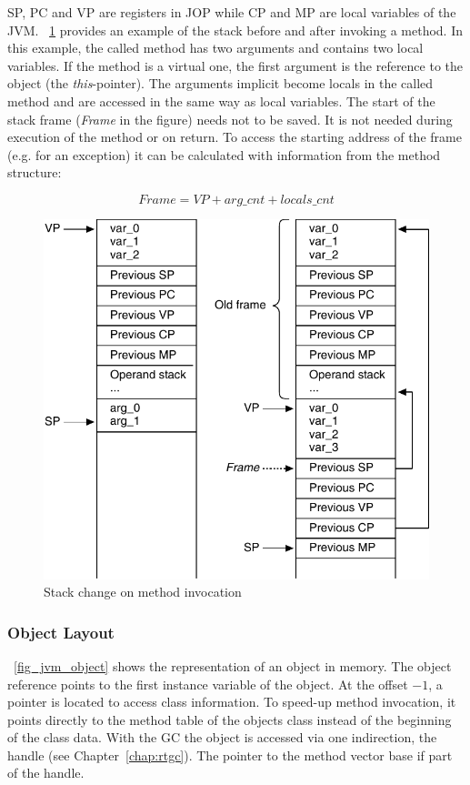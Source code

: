 SP, PC and VP are registers in JOP while CP and MP are local
variables of the JVM. \figurename~\ref{fig_jvm_stack_invoke}
provides an example of the stack before and after invoking a method.
In this example, the called method has two arguments and contains
two local variables. If the method is a virtual one, the first
argument is the reference to the object (the \emph{this}-pointer).
The arguments implicit become locals in the called method and are
accessed in the same way as local variables. The start of the stack
frame (\emph{Frame} in the figure) needs not to be saved. It is not
needed during execution of the method or on return. To access the
starting address of the frame (e.g. for an exception) it can be
calculated with information from the method structure:

\[Frame = VP + arg\_cnt + locals\_cnt\]

\begin{figure}
    \centering
    \includegraphics[scale=\picscale]{jvm/jvm_stack_invocation}
    \caption{Stack change on method invocation}
    \label{fig_jvm_stack_invoke}
\end{figure}

\subsubsection{Object Layout}

\figurename~\ref{fig_jvm_object} shows the representation of an
object in memory. The object reference points to the first instance
variable of the object. At the offset $-1$, a pointer is located to
access class information. To speed-up method invocation, it points
directly to the method table of the objects class instead of the
beginning of the class data. With the GC the object is accessed via
one indirection, the handle (see Chapter~\ref{chap:rtgc}). The
pointer to the method vector base if part of the handle.

